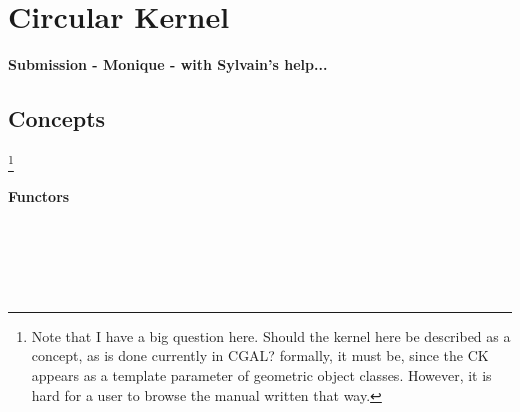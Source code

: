 \chapter{Circular Kernel}

\textbf{Submission - Monique - with Sylvain's help...}


\section*{Concepts}

\footnote{Note that I have a big question here. Should the kernel here
be described as a concept, as is done currently in CGAL? formally, it
must be, since the CK appears as a template parameter of geometric
object classes. However, it is hard for a user to browse the manual
written that way.}




	\subsubsection*{Functors} 

\\
\\


\\




